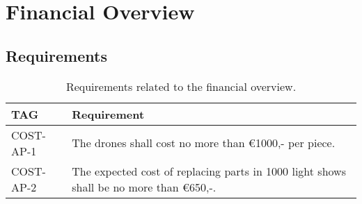 \chapter{Financial Overview}
\label{ch:finance}




\section{Requirements}

\begin{table}[H]
\caption{Requirements related to the financial overview.}
\label{tab:costreq}
\begin{tabular}{|l|l|}
\hline
\textbf{TAG} & \textbf{Requirement} \\ \hline
COST-AP-1 & The drones shall cost no more than €1000,- per piece. \\ \hline
COST-AP-2 & The expected cost of replacing parts in 1000 light shows shall be no more   than €650,-. \\ \hline
\end{tabular}
\end{table}
